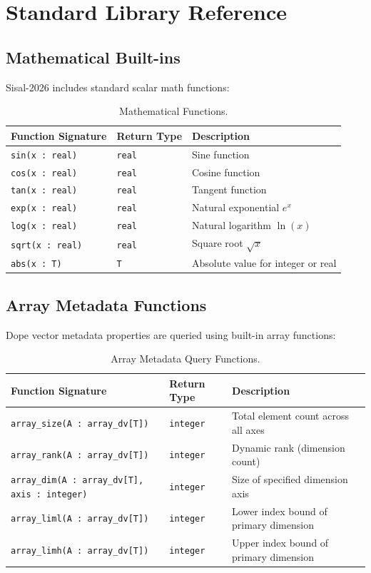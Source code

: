 \chapter{Standard Library Reference}
\label{chap:std_lib}

\section{Mathematical Built-ins}
Sisal-2026 includes standard scalar math functions:
\begin{table}[h!]
\centering
\begin{tabular}{lll}
\toprule
\textbf{Function Signature} & \textbf{Return Type} & \textbf{Description} \\
\midrule
\texttt{sin(x : real)} & \texttt{real} & Sine function \\
\texttt{cos(x : real)} & \texttt{real} & Cosine function \\
\texttt{tan(x : real)} & \texttt{real} & Tangent function \\
\texttt{exp(x : real)} & \texttt{real} & Natural exponential $e^x$ \\
\texttt{log(x : real)} & \texttt{real} & Natural logarithm $\ln(x)$ \\
\texttt{sqrt(x : real)} & \texttt{real} & Square root $\sqrt{x}$ \\
\texttt{abs(x : T)} & \texttt{T} & Absolute value for integer or real \\
\bottomrule
\end{tabular}
\caption{Mathematical Functions.}
\label{tab:math_funcs}
\end{table}

\section{Array Metadata Functions}
Dope vector metadata properties are queried using built-in array functions:
\begin{table}[h!]
\centering
\begin{tabularx}{\textwidth}{llX}
\toprule
\textbf{Function Signature} & \textbf{Return Type} & \textbf{Description} \\
\midrule
\texttt{array\_size(A : array\_dv[T])} & \texttt{integer} & Total element count across all axes \\
\texttt{array\_rank(A : array\_dv[T])} & \texttt{integer} & Dynamic rank (dimension count) \\
\texttt{array\_dim(A : array\_dv[T], axis : integer)} & \texttt{integer} & Size of specified dimension axis \\
\texttt{array\_liml(A : array\_dv[T])} & \texttt{integer} & Lower index bound of primary dimension \\
\texttt{array\_limh(A : array\_dv[T])} & \texttt{integer} & Upper index bound of primary dimension \\
\bottomrule
\end{tabularx}
\caption{Array Metadata Query Functions.}
\label{tab:array_metadata_funcs}
\end{table}

